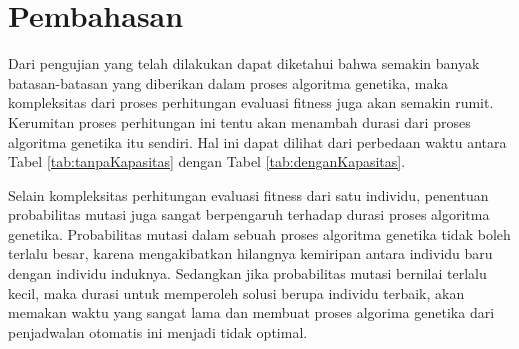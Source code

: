 \section{Pembahasan}
\label{sec:Pembahasan}

Dari pengujian yang telah dilakukan dapat diketahui bahwa semakin banyak batasan-batasan yang diberikan dalam proses algoritma genetika, maka kompleksitas dari proses perhitungan evaluasi fitness juga akan semakin rumit. 
Kerumitan proses perhitungan ini tentu akan menambah durasi dari proses algoritma genetika itu sendiri. Hal ini dapat dilihat dari perbedaan waktu antara Tabel \ref{tab:tanpaKapasitas} dengan Tabel \ref{tab:denganKapasitas}.

Selain kompleksitas perhitungan evaluasi fitness dari satu individu, penentuan probabilitas mutasi juga sangat berpengaruh terhadap durasi proses algoritma genetika. Probabilitas \linebreak mutasi dalam sebuah proses algoritma genetika tidak boleh terlalu besar, karena mengakibatkan hilangnya kemiripan antara individu baru dengan individu induknya. 
Sedangkan jika probabilitas mutasi bernilai terlalu kecil, maka durasi untuk memperoleh solusi berupa individu terbaik, akan memakan waktu yang sangat lama dan membuat proses algorima genetika dari penjadwalan otomatis ini menjadi tidak optimal. 

